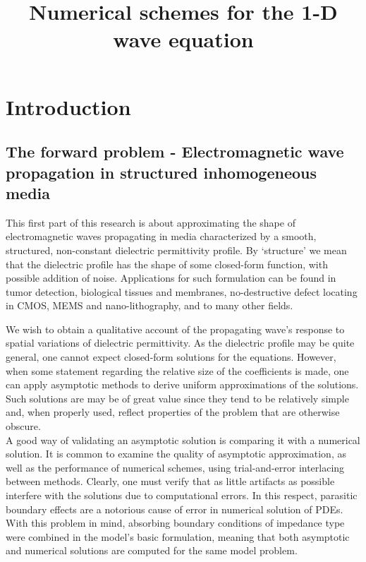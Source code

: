 \documentclass[12pt,twoside]{report}
\begin{document}
\title{Numerical schemes for the 1-D wave equation}

\newpage

\chapter{Introduction}
\section{The forward problem -  Electromagnetic wave propagation in structured inhomogeneous media}
\label{sec:IntroForwardEMpropagate}

This first part of this research is about approximating the shape of electromagnetic waves propagating in media characterized by  a smooth, structured, non-constant dielectric permittivity profile. By `structure' we mean that the dielectric profile has the shape of some closed-form function, with possible addition of noise. Applications for such formulation can be found in tumor detection,  biological tissues and membranes, no-destructive defect locating in CMOS, MEMS and nano-lithography, and to many other fields.  
 
We wish to obtain a qualitative account of the propagating wave's response to spatial variations of dielectric permittivity. As the dielectric profile may be quite general, one cannot expect closed-form solutions for the equations. However, when some statement regarding the relative size of the coefficients is made, one can apply asymptotic methods to derive uniform approximations of the solutions. Such solutions are may be of great value since they tend to be relatively simple and, when properly used, reflect properties of the problem that are otherwise obscure. \\

A good way of validating an asymptotic solution is comparing it with a numerical solution. It is common to examine the quality of asymptotic approximation, as well as the performance of numerical schemes, using trial-and-error interlacing between methods. Clearly, one must verify that as little artifacts as possible interfere with the solutions due to computational errors. In this respect, parasitic boundary effects are a notorious cause of error in numerical solution of PDEs. \\
With this problem in mind, absorbing boundary conditions of impedance type were combined in the model's basic formulation, meaning that both asymptotic and numerical solutions are computed for the same model problem.
\end{document}
